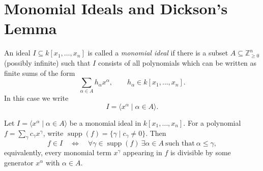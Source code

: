 \section{Monomial Ideals and Dickson’s Lemma}

\begin{definition}\label{def:monomial-ideal} %
  \leanok
  An ideal \(I \subseteq k[x_1,\dots,x_n]\) is called a \emph{monomial ideal} if there is a
  subset \(A \subseteq \mathbb{Z}_{\ge 0}^n\) (possibly infinite) such that \(I\) consists of all
  polynomials which can be written as finite sums of the form
  \[
    \sum_{\alpha \in A} h_\alpha x^\alpha,
    \qquad h_\alpha \in k[x_1,\dots,x_n].
  \]
  In this case we write
  \[
    I = \langle x^\alpha \mid \alpha \in A \rangle .
  \]
\end{definition}


\begin{lemma}\label{lem:mem_ideal_span_monomial_image} %
    \mathlibok
    Let $I=\langle x^\alpha \mid \alpha\in A\rangle$ be a monomial ideal in $k[x_1,\dots,x_n]$.
    For a polynomial $f=\sum_{\gamma} c_\gamma x^\gamma$, write
    $\operatorname{supp}(f)=\{\gamma \mid c_\gamma\neq 0\}$.
    Then
    \[
      f\in I \quad\Longleftrightarrow\quad
      \forall \gamma\in\operatorname{supp}(f)\ \exists \alpha\in A\ \text{such that}\ \alpha\le \gamma,
    \]
    equivalently, every monomial term $x^\gamma$ appearing in $f$ is divisible by some generator $x^\alpha$ with $\alpha\in A$.
\end{lemma}

